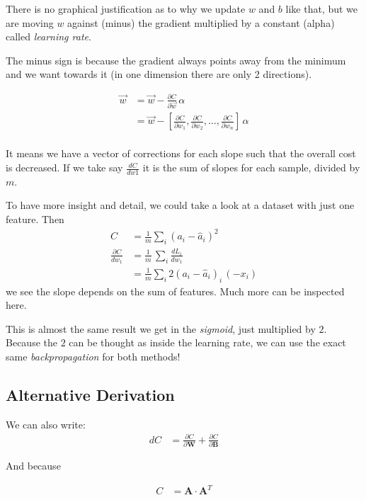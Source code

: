 There is no graphical justification as to why we update $w$ and $b$ like that, but we are moving $w$ against (minus) the gradient multiplied by a constant (alpha) called \textit{learning rate}.

The minus sign is because the gradient always points away from the minimum and we want towards it (in one dimension there are only 2 directions). 

\begin{align}
  \vec{w} &= \vec{w} -\frac{\partial C}{\partial \vec{w}}\,\alpha\\
  &= \vec{w} -[\frac{\partial C}{\partial w_1}, \frac{\partial C}{\partial w_2},\ldots, \frac{\partial C}{\partial w_n}]\,\alpha\\
\end{align}

It means we have a vector of corrections for each slope such that the overall cost is decreased. If we take say $\frac{dC}{dw1}$ it is the sum of slopes for each sample, divided by $m$. 

To have more insight and detail, we could take a look at a dataset with just one feature. Then 
\begin{align*}
  C &= \frac{1}{m}\sum_i(a_i - \hat{a}_i)^2 \\ 
  \frac{\partial C}{dw_1}&= \frac{1}{m}\,\sum_i \frac{dL_i}{dw_1} \\
  &= \frac{1}{m}\sum_i 2(a_i - \hat{a}_i)_i\,(-x_i)
\end{align*}
we see the slope depends on the sum of features. Much more can be inspected here.

This is almost the same result we get in the \textit{sigmoid}, just multiplied by $2$. Because the $2$ can be thought as inside the learning rate, we can use the exact same \textit{backpropagation} for both methods!

\subsection{Alternative Derivation}
We can also write:
\begin{align*}
  dC &= \frac{\partial C}{\partial \mathbf{W}} + \frac{\partial C}{\partial \mathbf{B}}
\end{align*}

And because 

\begin{align*}
  C &= \mathbf{A}\cdot\mathbf{A}^T
\end{align*}

